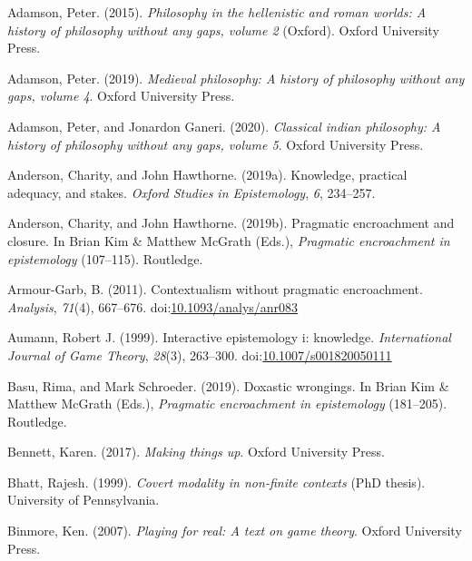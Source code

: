 \documentclass[
  12pt,
  letterpaper,
]{scrbook}
\newlength{\cslhangindent}
\newenvironment{CSLReferences}[2] %
 {\begin{list}{}{%
  \setlength{\itemindent}{0pt}
  \setlength{\leftmargin}{0pt}
  \setlength{\parsep}{0pt}
  \ifodd #1
   \setlength{\leftmargin}{\cslhangindent}
   \setlength{\itemindent}{-1\cslhangindent}
  \fi
  \setlength{\itemsep}{#2\baselineskip}}}
 {\end{list}}
\begin{document}
\label{refs}
\begin{CSLReferences}{1}{0}
Adamson, Peter. (2015). \emph{Philosophy in the hellenistic and roman
worlds: A history of philosophy without any gaps, volume 2} (Oxford).
Oxford University Press.

Adamson, Peter. (2019). \emph{Medieval philosophy: A history of
philosophy without any gaps, volume 4}. {O}xford {U}niversity {P}ress.

Adamson, Peter, and Jonardon Ganeri. (2020). \emph{Classical indian
philosophy: A history of philosophy without any gaps, volume 5}. Oxford
University Press.

Anderson, Charity, and John Hawthorne. (2019a). Knowledge, practical
adequacy, and stakes. \emph{Oxford Studies in Epistemology}, \emph{6},
234--257.

Anderson, Charity, and John Hawthorne. (2019b). Pragmatic encroachment
and closure. In Brian Kim \& Matthew McGrath (Eds.), \emph{Pragmatic
encroachment in epistemology} (107--115). Routledge.

Armour-Garb, B. (2011). Contextualism without pragmatic encroachment.
\emph{Analysis}, \emph{71}(4), 667--676.
doi:\href{https://doi.org/10.1093/analys/anr083}{10.1093/analys/anr083}

Aumann, Robert J. (1999). Interactive epistemology i: knowledge.
\emph{International Journal of Game Theory}, \emph{28}(3), 263--300.
doi:\href{https://doi.org/10.1007/s001820050111}{10.1007/s001820050111}

Basu, Rima, and Mark Schroeder. (2019). Doxastic wrongings. In Brian Kim
\& Matthew McGrath (Eds.), \emph{Pragmatic encroachment in epistemology}
(181--205). Routledge.

Bennett, Karen. (2017). \emph{Making things up}. Oxford University
Press.

Bhatt, Rajesh. (1999). \emph{Covert modality in non-finite contexts}
(PhD thesis). University of Pennsylvania.

Binmore, Ken. (2007). \emph{Playing for real: A text on game theory}.
Oxford University Press.


\end{CSLReferences}
\end{document}
